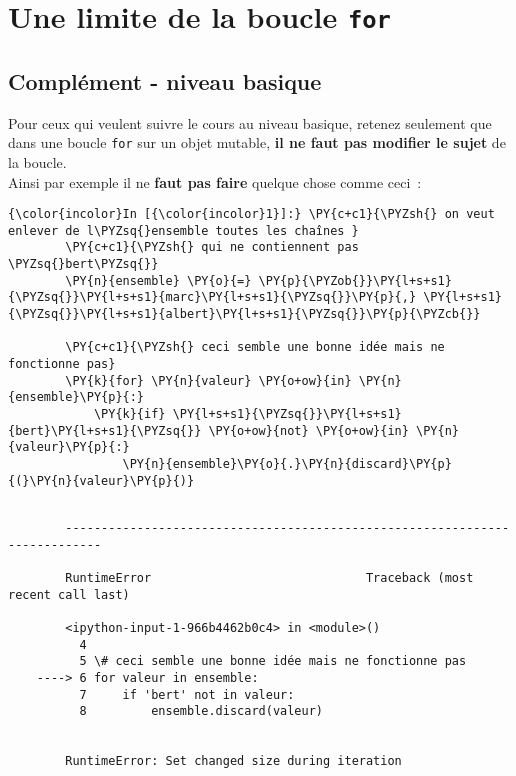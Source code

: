     \hypertarget{une-limite-de-la-boucle-for}{%
\section{\texorpdfstring{Une limite de la boucle
\texttt{for}}{Une limite de la boucle for}}\label{une-limite-de-la-boucle-for}}

    \hypertarget{compluxe9ment---niveau-basique}{%
\subsection{Complément - niveau
basique}\label{compluxe9ment---niveau-basique}}

    Pour ceux qui veulent suivre le cours au niveau basique, retenez
seulement que dans une boucle \texttt{for} sur un objet mutable,
\textbf{il ne faut pas modifier le sujet} de la boucle.\\

Ainsi par exemple il ne \textbf{faut pas faire} quelque chose comme
ceci~:

    \begin{Verbatim}[commandchars=\\\{\}]
{\color{incolor}In [{\color{incolor}1}]:} \PY{c+c1}{\PYZsh{} on veut enlever de l\PYZsq{}ensemble toutes les chaînes }
        \PY{c+c1}{\PYZsh{} qui ne contiennent pas \PYZsq{}bert\PYZsq{}}
        \PY{n}{ensemble} \PY{o}{=} \PY{p}{\PYZob{}}\PY{l+s+s1}{\PYZsq{}}\PY{l+s+s1}{marc}\PY{l+s+s1}{\PYZsq{}}\PY{p}{,} \PY{l+s+s1}{\PYZsq{}}\PY{l+s+s1}{albert}\PY{l+s+s1}{\PYZsq{}}\PY{p}{\PYZcb{}}
        
        \PY{c+c1}{\PYZsh{} ceci semble une bonne idée mais ne fonctionne pas}
        \PY{k}{for} \PY{n}{valeur} \PY{o+ow}{in} \PY{n}{ensemble}\PY{p}{:}
            \PY{k}{if} \PY{l+s+s1}{\PYZsq{}}\PY{l+s+s1}{bert}\PY{l+s+s1}{\PYZsq{}} \PY{o+ow}{not} \PY{o+ow}{in} \PY{n}{valeur}\PY{p}{:}
                \PY{n}{ensemble}\PY{o}{.}\PY{n}{discard}\PY{p}{(}\PY{n}{valeur}\PY{p}{)}
\end{Verbatim}


    \begin{Verbatim}[commandchars=\\\{\}]

        ---------------------------------------------------------------------------

        RuntimeError                              Traceback (most recent call last)

        <ipython-input-1-966b4462b0c4> in <module>()
          4 
          5 \# ceci semble une bonne idée mais ne fonctionne pas
    ----> 6 for valeur in ensemble:
          7     if 'bert' not in valeur:
          8         ensemble.discard(valeur)
    

        RuntimeError: Set changed size during iteration

    \end{Verbatim}

